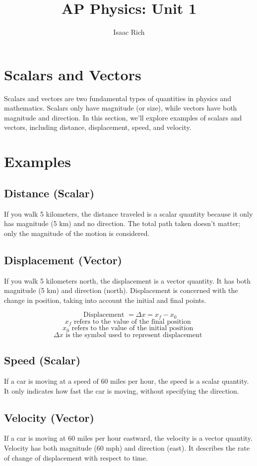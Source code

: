 \documentclass{article}
\title{AP Physics: Unit 1}
\author{Isaac Rich}
\theoremstyle{mytheoremstyle}
\theoremstyle{mytheoremstyle}
\theoremstyle{myproblemstyle}
\begin{document}
\maketitle

\section{Scalars and Vectors}
Scalars and vectors are two fundamental types of quantities in physics and mathematics. Scalars only have magnitude (or size), while vectors have both magnitude and direction. In this section, we'll explore examples of scalars and vectors, including distance, displacement, speed, and velocity.

\section*{Examples}
\subsection{Distance (Scalar)}
If you walk 5 kilometers, the distance traveled is a scalar quantity because it only has magnitude (5 km) and no direction. The total path taken doesn't matter; only the magnitude of the motion is considered.

\subsection{Displacement (Vector)}
If you walk 5 kilometers north, the displacement is a vector quantity. It has both magnitude (5 km) and direction (north). Displacement is concerned with the change in position, taking into account the initial and final points.

$$\text { Displacement }=\Delta x=x_f-x_0$$
$$ x_f \text { refers to the value of the final position }$$
$$ x_0 \text { refers to the value of the initial position }$$
$$ \Delta x \text { is the symbol used to represent displacement }$$
\subsection{Speed (Scalar)}
If a car is moving at a speed of 60 miles per hour, the speed is a scalar quantity. It only indicates how fast the car is moving, without specifying the direction.

\subsection{Velocity (Vector)}
If a car is moving at 60 miles per hour eastward, the velocity is a vector quantity. Velocity has both magnitude (60 mph) and direction (east). It describes the rate of change of displacement with respect to time.
\newpage
\end{document}
